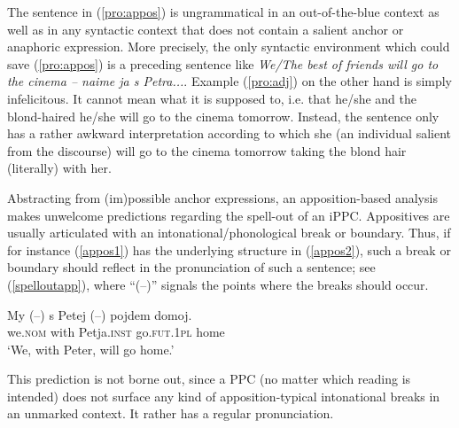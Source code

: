 \documentclass[output=paper,colorlinks,citecolor=brown]{langscibook}
\begin{document}
\noindent The sentence in (\ref{pro:appos}) is ungrammatical in an out-of-the-blue context as well as in any syntactic context that does not contain a salient anchor or anaphoric expression. More precisely, the only syntactic environment which could save (\ref{pro:appos}) is a preceding sentence like \textit{We/The best of friends will go to the cinema -- naime ja s Petra...}. Example (\ref{pro:adj}) on the other hand is simply infelicitous. It cannot mean what it is supposed to, i.e. that he/she and the blond-haired he/she will go to the cinema tomorrow. Instead, the sentence only has a rather awkward interpretation according to which she (an individual salient from the discourse) will go to the cinema tomorrow taking the blond hair (literally) with her. 


Abstracting from (im)possible anchor expressions, an apposition-based analysis makes unwelcome predictions regarding the spell-out of an iPPC. Appositives are usually articulated with an intonational/phonological break or boundary. Thus, if for instance (\ref{appos1}) has the underlying structure in (\ref{appos2}), such a break or boundary should reflect in the pronunciation of such a sentence; see (\ref{spelloutapp}), where ``(--)'' signals the points where the breaks should occur. 

\ea \label{spelloutapp}

\gll My (--) s Petej (--) pojdem domoj.\\
we.\textsc{nom} {} with Petja.\textsc{inst} {} go.\textsc{fut.1pl} home\\
\glt `We, with Peter, will go home.'
\z

\noindent This prediction is not borne out, since a PPC (no matter which reading is intended) does not surface any kind of apposition-typical intonational breaks in an unmarked context. It rather has a regular pronunciation. 
\end{document}
